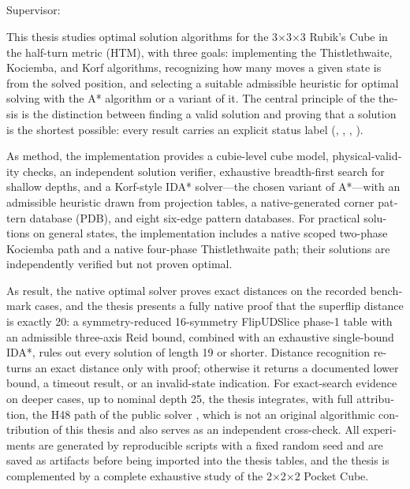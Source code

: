 \chapter*{}
\begin{english}
\begin{center}
\textbf{\thesisEnglishTitle}\\[0.25cm]
\thesisStudentNameEnglish\\
Supervisor: \thesisSupervisor
\end{center}

This thesis studies optimal solution algorithms for the 3×3×3 Rubik's Cube in the half-turn metric (HTM), with three goals: implementing the Thistlethwaite, Kociemba, and Korf algorithms, recognizing how many moves a given state is from the solved position, and selecting a suitable admissible heuristic for optimal solving with the A* algorithm or a variant of it. The central principle of the thesis is the distinction between finding a valid solution and proving that a solution is the shortest possible: every result carries an explicit status label (, , , ).

As method, the implementation provides a cubie-level cube model, physical-validity checks, an independent solution verifier, exhaustive breadth-first search for shallow depths, and a Korf-style IDA* solver---the chosen variant of A*---with an admissible heuristic drawn from projection tables, a native-generated corner pattern database (PDB), and eight six-edge pattern databases. For practical solutions on general states, the implementation includes a native scoped two-phase Kociemba path and a native four-phase Thistlethwaite path; their solutions are independently verified but not proven optimal.

As result, the native optimal solver proves exact distances on the recorded benchmark cases, and the thesis presents a fully native proof that the superflip distance is exactly 20: a symmetry-reduced 16-symmetry FlipUDSlice phase-1 table with an admissible three-axis Reid bound, combined with an exhaustive single-bound IDA*, rules out every solution of length 19 or shorter. Distance recognition returns an exact distance only with proof; otherwise it returns a documented lower bound, a timeout result, or an invalid-state indication. For exact-search evidence on deeper cases, up to nominal depth 25, the thesis integrates, with full attribution, the H48 path of the public solver , which is not an original algorithmic contribution of this thesis and also serves as an independent cross-check. All experiments are generated by reproducible scripts with a fixed random seed and are saved as artifacts before being imported into the thesis tables, and the thesis is complemented by a complete exhaustive study of the 2×2×2 Pocket Cube.


\end{english}
